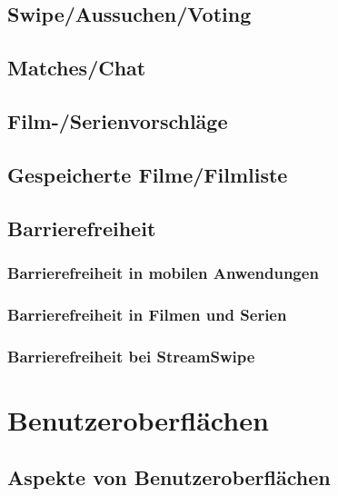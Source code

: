 \documentclass[11pt,a4paper]{article}
\begin{document}
\subsection{Swipe/Aussuchen/Voting}		
\subsection{Matches/Chat}		
\subsection{Film-/Serienvorschläge}
\subsection{Gespeicherte Filme/Filmliste}		

\subsection{Barrierefreiheit}
\label{sec:barrierefreiheit}


\subsubsection{Barrierefreiheit in mobilen Anwendungen}


\subsubsection{Barrierefreiheit in Filmen und Serien}


\subsubsection{Barrierefreiheit bei StreamSwipe}
\label{sec:bf-streamswipe}



\clearpage
\section{Benutzeroberflächen}
\label{sec:UI-allgemein}


\subsection{Aspekte von Benutzeroberflächen}
\label{sec:UI-Aspekte}

\end{document}
